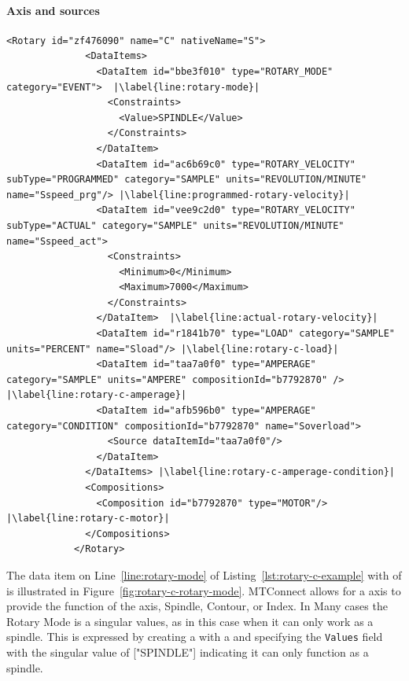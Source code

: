 \FloatBarrier

\paragraph{ Axis and  sources}

\begin{lstlisting}[firstnumber=last,%
    caption={Rotary C Axis},label={lst:rotary-c-example},escapechar=|]
            <Rotary id="zf476090" name="C" nativeName="S">
              <DataItems>
                <DataItem id="bbe3f010" type="ROTARY_MODE" category="EVENT">  |\label{line:rotary-mode}|
                  <Constraints>
                    <Value>SPINDLE</Value>
                  </Constraints>
                </DataItem>
                <DataItem id="ac6b69c0" type="ROTARY_VELOCITY" subType="PROGRAMMED" category="SAMPLE" units="REVOLUTION/MINUTE" name="Sspeed_prg"/> |\label{line:programmed-rotary-velocity}|
                <DataItem id="vee9c2d0" type="ROTARY_VELOCITY" subType="ACTUAL" category="SAMPLE" units="REVOLUTION/MINUTE" name="Sspeed_act"> 
                  <Constraints>
                    <Minimum>0</Minimum>
                    <Maximum>7000</Maximum>
                  </Constraints>
                </DataItem>  |\label{line:actual-rotary-velocity}|
                <DataItem id="r1841b70" type="LOAD" category="SAMPLE" units="PERCENT" name="Sload"/> |\label{line:rotary-c-load}|
                <DataItem id="taa7a0f0" type="AMPERAGE" category="SAMPLE" units="AMPERE" compositionId="b7792870" /> |\label{line:rotary-c-amperage}|
                <DataItem id="afb596b0" type="AMPERAGE" category="CONDITION" compositionId="b7792870" name="Soverload">
                  <Source dataItemId="taa7a0f0"/>
                </DataItem>
              </DataItems> |\label{line:rotary-c-amperage-condition}|
              <Compositions>
                <Composition id="b7792870" type="MOTOR"/> |\label{line:rotary-c-motor}|
              </Compositions>
            </Rotary>
\end{lstlisting}

The data item on Line~\ref{line:rotary-mode} of Listing~\ref{lst:rotary-c-example} with  of  is illustrated in Figure~\ref{fig:rotary-c-rotary-mode}. MTConnect allows for a  axis to provide the function of the axis, Spindle, Contour, or Index. In Many cases the Rotary Mode is a singular values, as in this case when it can only work as a spindle. This is expressed by creating a  with a  and specifying the \texttt{Values} field with the singular value of ["SPINDLE"] indicating it can only function as a spindle. 

